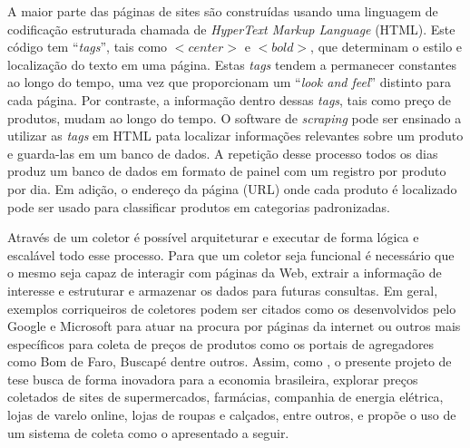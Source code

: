 A maior parte das páginas de sites são construídas usando uma linguagem de codificação estruturada chamada de \emph{HyperText Markup Language} (HTML). Este código tem “\emph{tags}”, tais como $<center>$ e $<bold>$, que determinam o estilo e localização do texto em uma página. Estas \emph{tags} tendem a permanecer constantes ao longo do tempo, uma vez que proporcionam um “\emph{look and feel}” distinto para cada página. Por contraste, a informação dentro dessas \emph{tags}, tais como preço de produtos, mudam ao longo do tempo. O software de \emph{scraping} pode ser ensinado a utilizar as \emph{tags} em HTML pata localizar informações relevantes sobre um produto e guarda-las em um banco de dados. A repetição desse processo todos os dias produz um banco de dados em formato de painel com um registro por produto por dia. Em adição, o endereço da página (URL) onde cada produto é localizado pode ser usado para classificar produtos em categorias padronizadas. 

Através de um coletor é possível arquiteturar e executar de forma lógica e escalável todo esse processo. Para que um coletor seja funcional é necessário que o mesmo seja capaz de interagir com páginas da Web, extrair a informação de interesse e estruturar e armazenar os dados para futuras consultas. Em geral, exemplos corriqueiros de coletores podem ser citados como os desenvolvidos pelo Google e Microsoft para atuar na procura por páginas da internet ou outros mais específicos para coleta de preços de produtos como os portais de agregadores como Bom de Faro, Buscapé dentre outros. Assim, como \citet{cavallo2010scraped}, o presente projeto de tese busca de forma inovadora para a economia brasileira, explorar preços coletados de sites de supermercados, farmácias, companhia de energia elétrica, lojas de varelo online, lojas de roupas e calçados, entre outros, e propõe o uso de um sistema de coleta como o apresentado a seguir. 


